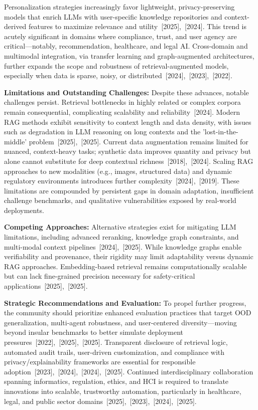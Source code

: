 \documentclass[sigconf]{acmart}
\begin{document}
Personalization strategies increasingly favor lightweight, privacy-preserving models that enrich LLMs with user-specific knowledge repositories and context-derived features to maximize relevance and utility~\cite{ref49}[2025],~\cite{ref50}[2024]. This trend is acutely significant in domains where compliance, trust, and user agency are critical—notably, recommendation, healthcare, and legal AI. Cross-domain and multimodal integration, via transfer learning and graph-augmented architectures, further expands the scope and robustness of retrieval-augmented models, especially when data is sparse, noisy, or distributed~\cite{ref14}[2024],~\cite{ref15}[2023],~\cite{ref21}[2022].

\textbf{Limitations and Outstanding Challenges:}
Despite these advances, notable challenges persist. Retrieval bottlenecks in highly related or complex corpora remain consequential, complicating scalability and reliability~\cite{ref13}[2024]. Modern RAG methods exhibit sensitivity to context length and data density, with issues such as degradation in LLM reasoning on long contexts and the 'lost-in-the-middle' problem~\cite{ref42}[2025],~\cite{ref49}[2025]. Current data augmentation remains limited for nuanced, context-heavy tasks; synthetic data improves quantity and privacy but alone cannot substitute for deep contextual richness~\cite{ref56}[2018],~\cite{ref57}[2024]. Scaling RAG approaches to new modalities (e.g., images, structured data) and dynamic regulatory environments introduces further complexity~\cite{ref36}[2024],~\cite{ref40}[2019]. These limitations are compounded by persistent gaps in domain adaptation, insufficient challenge benchmarks, and qualitative vulnerabilities exposed by real-world deployments.

\textbf{Competing Approaches:}
Alternative strategies exist for mitigating LLM limitations, including advanced reranking, knowledge graph constraints, and multi-modal context pipelines~\cite{ref48}[2024],~\cite{ref52}[2025]. While knowledge graphs enable verifiability and provenance, their rigidity may limit adaptability versus dynamic RAG approaches. Embedding-based retrieval remains computationally scalable but can lack fine-grained precision necessary for safety-critical applications~\cite{ref3}[2025],~\cite{ref49}[2025].

\textbf{Strategic Recommendations and Evaluation:}
To propel further progress, the community should prioritize enhanced evaluation practices that target OOD generalization, multi-agent robustness, and user-centered diversity—moving beyond insular benchmarks to better simulate deployment pressures~\cite{ref4}[2022],~\cite{ref5}[2025],~\cite{ref39}[2025]. Transparent disclosure of retrieval logic, automated audit trails, user-driven customization, and compliance with privacy/explainability frameworks are essential for responsible adoption~\cite{ref34}[2023],~\cite{ref36}[2024],~\cite{ref48}[2024],~\cite{ref52}[2025]. Continued interdisciplinary collaboration spanning informatics, regulation, ethics, and HCI is required to translate innovations into scalable, trustworthy automation, particularly in healthcare, legal, and public sector domains~\cite{ref2}[2025],~\cite{ref25}[2023],~\cite{ref50}[2024],~\cite{ref54}[2025].
\end{document}

